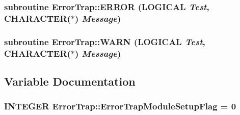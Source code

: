 \label{namespace_error_trap_ae80447005fe2502fdd96646cd1510389}
\hypertarget{namespace_error_trap_ac61176418131d4f6becefa8914209aa6}{
\subsubsection[{ERROR}]{\setlength{\rightskip}{0pt plus 5cm}subroutine ErrorTrap::ERROR (LOGICAL {\em Test}, \/  CHARACTER($\ast$) {\em Message})}}
\label{namespace_error_trap_ac61176418131d4f6becefa8914209aa6}
\hypertarget{namespace_error_trap_a333255057ba2633db5a01b25ec3aa18e}{
\subsubsection[{WARN}]{\setlength{\rightskip}{0pt plus 5cm}subroutine ErrorTrap::WARN (LOGICAL {\em Test}, \/  CHARACTER($\ast$) {\em Message})}}
\label{namespace_error_trap_a333255057ba2633db5a01b25ec3aa18e}


\subsection{Variable Documentation}
\hypertarget{namespace_error_trap_ab0af30c4946661d94501e25bd1b61d17}{
\subsubsection[{ErrorTrapModuleSetupFlag}]{\setlength{\rightskip}{0pt plus 5cm}INTEGER {\bf ErrorTrap::ErrorTrapModuleSetupFlag} = 0}}
\label{namespace_error_trap_ab0af30c4946661d94501e25bd1b61d17}
